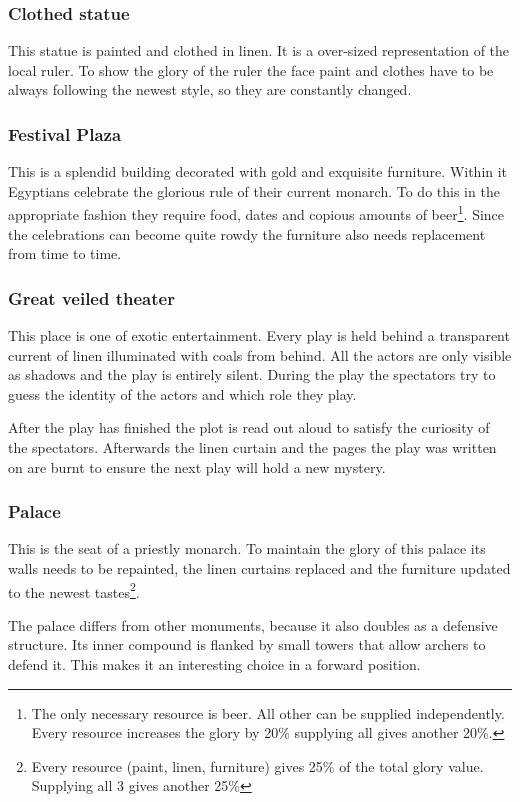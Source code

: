 \documentclass[a4paper]{book}
\begin{document}
\subsubsection{Clothed statue}
This statue is painted and clothed in linen. It is a over-sized representation
of the local ruler. To show the glory of the ruler the face paint and clothes
have to be always following the newest style, so they are constantly changed.

\subsubsection{Festival Plaza}
This is a splendid building decorated with gold and exquisite furniture. Within
it \gls{Egyptians} celebrate the glorious rule of their current monarch. To do
this in the appropriate fashion they require food, dates and copious amounts of
beer\footnote{ The only necessary resource is beer. All other can be supplied
	independently. Every resource increases the glory by 20\% supplying all gives
	another 20\%. }. Since the celebrations can become quite rowdy the furniture
also needs replacement from time to time.

\subsubsection{Great veiled theater}
This place is one of exotic entertainment. Every play is held behind a
transparent current of linen illuminated with coals from behind. All the actors
are only visible as shadows and the play is entirely silent. During the play
the spectators try to guess the identity of the actors and which role they
play.

After the play has finished the plot is read out aloud to satisfy the curiosity
of the spectators. Afterwards the linen curtain and the pages the play was
written on are burnt to ensure the next play will hold a new mystery.

\subsubsection{Palace}
This is the seat of a priestly monarch. To maintain the glory of this palace
its walls needs to be repainted, the linen curtains replaced and the furniture
updated to the newest tastes\footnote{ Every resource (paint, linen, furniture)
	gives 25\% of the total glory value. Supplying all 3 gives another 25\% }.

The palace differs from other monuments, because it also doubles as a defensive
structure. Its inner compound is flanked by small towers that allow archers to
defend it. This makes it an interesting choice in a forward position.
\end{document}
